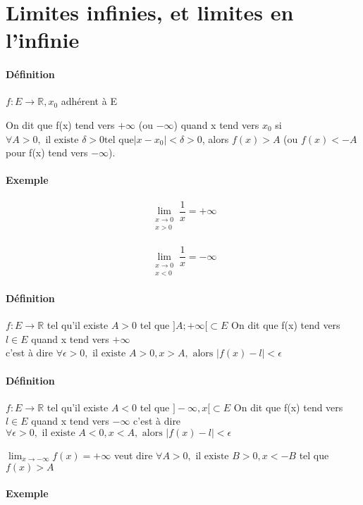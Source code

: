\section{Limites infinies, et limites en l'infinie}
\paragraph{Définition} $f:E\rightarrow \mathbb{R}, x_0$ adhérent à E

On dit que f(x) tend vers $+\infty$ (ou $-\infty$) quand x tend vers $x_0$ si$\forall A > 0, \text{ il existe } \delta > 0 \text{tel que} |x - x_0| < \delta > 0$, alors $f(x) > A$ (ou $f(x) < -A$ pour f(x) tend vers $-\infty$).

\paragraph{Exemple} \[\lim_{\substack{x \to 0 \\ x > 0}} \frac{1}{x} = +\infty\]
~\\

\[\lim_{\substack{x \to 0 \\ x < 0}} \frac{1}{x} = -\infty\]

\paragraph{Définition} $f:E \rightarrow \mathbb{R}$ tel qu'il existe $A >0$ tel que $]A; +\infty[ \subset E$
	On dit que f(x) tend vers $l \in E$ quand x tend vers $+\infty$ 
	~\\
	c'est à dire $\forall \epsilon > 0, \text{ il existe } A >0, x > A, \text{ alors } |f(x) - l| < \epsilon$

\paragraph{Définition} $f:E \rightarrow \mathbb{R}$ tel qu'il existe $A <0$ tel que $]-\infty, x[ \subset E$
	On dit que f(x) tend vers $l \in E$ quand x tend vers $-\infty$ 
	c'est à dire $\forall \epsilon > 0, \text{ il existe } A <0, x < A, \text{ alors } |f(x) - l| < \epsilon$

	$\lim_{x \to -\infty} f(x) = +\infty$ veut dire 
	$\forall A >0, \text{ il existe } B > 0, x < -B$ tel que $f(x) > A$

\paragraph{Exemple}

